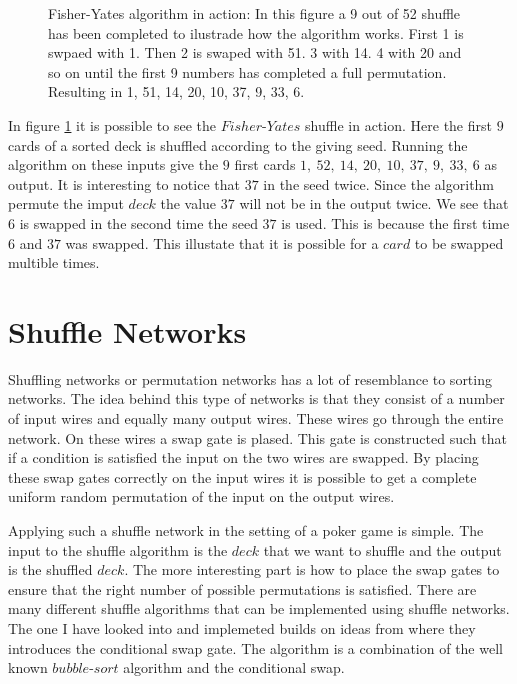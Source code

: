 \documentclass[twoside,11pt,openright]{report}
\begin{document}
\bigskip

\begin{figure}
\centering
\scalebox{1.5}{}
\caption{Fisher-Yates algorithm in action: In this figure a 9 out of 52 shuffle has been completed to ilustrade how the algorithm works. First 1 is swpaed with 1. Then 2 is swaped with 51. 3 with 14. 4 with 20 and so on until the first 9 numbers has completed a full permutation. Resulting in 1, 51, 14, 20, 10, 37, 9, 33, 6.}
\label{fig:fisher_yates}
\end{figure}

In figure \ref{fig:fisher_yates} it is possible to see the $Fisher\text{-}Yates$ shuffle in action. Here the first $9$ cards of a sorted deck is shuffled according to the giving seed. Running the algorithm on these inputs give the $9$ first cards $1,~52,~14,~20,~10,~37,~9,~33,~6$ as output. It is interesting to notice that $37$ in the seed twice. Since the algorithm permute the imput $deck$ the value $37$ will not be in the output twice. We see that $6$ is swapped in the second time the seed $37$ is used. This is because the first time $6$ and $37$ was swapped. This illustate that it is possible for a $card$ to be swapped multible times.


\section{Shuffle Networks}
Shuffling networks or permutation networks has a lot of resemblance to sorting networks. The idea behind this type of networks is that they consist of a number of input wires and equally many output wires. These wires go through the entire network. On these wires a swap gate is plased. This gate is constructed such that if a condition is satisfied the input on the two wires are swapped. By placing these swap gates correctly on the input wires it is possible to get a complete uniform random permutation of the input on the output wires.

Applying such a shuffle network in the setting of a poker game is simple. The input to the shuffle algorithm is the $deck$ that we want to shuffle and the output is the shuffled $deck$. The more interesting part is how to place the swap gates to ensure that the right number of possible permutations is satisfied. There are many different shuffle algorithms that can be implemented using shuffle networks. The one I have looked into and implemeted builds on ideas from  where they introduces the conditional swap gate. The algorithm is a combination of the well known $bubble\text{-}sort$ algorithm and the conditional swap.
\end{document}
